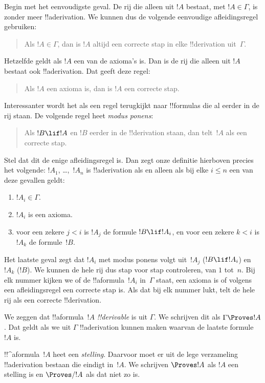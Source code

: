 \documentclass[openany]{memoir}
\begin{document}
Begin met het eenvoudigste geval. De rij die alleen uit $!A$ bestaat,
met $!A \in \Gamma$, is zonder meer !!a{derivation}. We kunnen dus de
volgende eenvoudige afleidingsregel gebruiken:
\begin{quote}
  Als $!A \in \Gamma$, dan is $!A$ altijd een correcte stap in elke
  !!{derivation} uit~$\Gamma$.
\end{quote}
Hetzelfde geldt als $!A$ een van de axioma's is. Dan is de rij die
alleen uit $!A$ bestaat ook !!a{derivation}. Dat geeft deze regel:
\begin{quote}
  Als $!A$ een axioma is, dan is $!A$ een correcte stap.
\end{quote}
Interessanter wordt het als een regel terugkijkt naar !!{formula}s die
al eerder in de rij staan. De volgende regel heet \emph{modus ponens}:
\begin{quote}
  Als $!B \lif !A$ en $!B$ eerder in de !!{derivation} staan, dan
  telt~$!A$ als een correcte stap.
\end{quote}
Stel dat dit de enige afleidingsregel is. Dan zegt onze definitie
hierboven precies het volgende: $!A_1$, \dots,~$!A_n$ is
!!a{derivation} als en alleen als bij elke $i \le n$ een van deze
gevallen geldt:
\begin{enumerate}
\item $!A_i \in \Gamma$.
\item $!A_i$ is een axioma.
\item voor een zekere $j < i$ is $!A_j$ de formule $!B \lif !A_i$, en
  voor een zekere $k < i$ is $!A_k$ de formule~$!B$.
\end{enumerate}
Het laatste geval zegt dat $!A_i$ met modus ponens volgt uit~$!A_j$
($!B \lif !A_i$) en $!A_k$ ($!B$). We kunnen de hele rij dus stap voor
stap controleren, van $1$ tot~$n$. Bij elk nummer kijken we of de
!!a{formula}~$!A_i$ in~$\Gamma$ staat, een axioma is of volgens een
afleidingsregel een correcte stap is. Als dat bij elk nummer lukt, telt
de hele rij als een correcte !!{derivation}.

\begin{defn}[!!^{derivability}]
We zeggen dat !!a{formula}~$!A$ \emph{!!{derivable}} is uit $\Gamma$.
We schrijven dit als $\Gamma \Proves !A$. Dat geldt als we uit
$\Gamma$ !!a{derivation} kunnen maken waarvan de laatste formule $!A$
is.
\end{defn}

\begin{defn}[Stellingen]
!!^a{formula}~$!A$ heet een \emph{stelling}. Daarvoor moet er uit de
lege verzameling !!a{derivation} bestaan die eindigt in~$!A$. We
schrijven $\Proves !A$ als $!A$ een stelling is en $\Proves/ !A$ als
dat niet zo is.
\end{defn}
\endgroup
\end{document}
